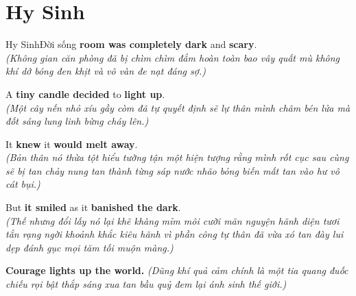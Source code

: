 \section{Hy Sinh}
\begin{truyen}{Hy Sinh}{Đời sống}
 \textbf{room was completely dark} and \textbf{scary}.\\
\textit{(Không gian căn phòng đã bị chìm chìm đắm hoàn toàn bao vây quất mù không khí dở bóng đen khịt và vô vàn đe nạt đáng sợ.)}

A \textbf{tiny candle decided} to \textbf{light up}.\\
\textit{(Một cây nến nhỏ xíu gầy còm đã tự quyết định sẽ lự thân mình châm bén lửa mà đốt sáng lung linh bừng cháy lên.)}

It \textbf{knew} it \textbf{would melt away}.\\
\textit{(Bản thân nó thừa tột hiểu tường tận một hiện tượng rằng mình rốt cục sau cùng sẽ bị tan chảy nung tan thành từng sáp nước nhão bỏng biến mất tan vào hư vô cát bụi.)}

But \textbf{it smiled} as it \textbf{banished the dark}.\\
\textit{(Thế nhưng đổi lấy nó lại khẽ khàng mỉm môi cười mãn nguyện hãnh diện tươi tắn rạng ngời khoảnh khắc kiêu hãnh vì phần công tự thân đã vừa xó tan đày lui dẹp đánh gục mọi tăm tối muộn màng.)}
\end{truyen}

\begin{baihoc}
  \textbf{Courage lights up the world.} \textit{(Dũng khí quả cảm chính là một tia quang đuốc chiếu rọi bật thắp sáng xua tan bầu quỷ đem lại ánh sinh thế giới.)}
\end{baihoc}

\vspace{0.8cm}

\ngayDay{}
